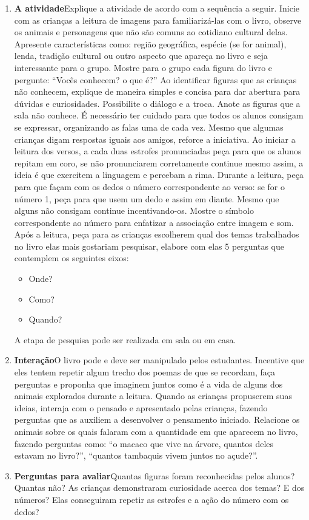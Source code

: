 \documentclass[11pt]{extarticle}
\begin{document}
\begin{enumerate}
\item \textbf{A atividade}\quad Explique a atividade de acordo com a sequência a seguir. Inicie com as crianças a leitura de imagens para familiarizá-las com o livro, observe os animais e personagens que não são comuns ao cotidiano cultural delas.  Apresente características como: região geográfica, espécie (se for animal), lenda, tradição cultural ou outro aspecto que apareça no livro e seja interessante para o grupo. 
Mostre para o grupo cada figura do livro e pergunte: ``Vocês conhecem? o que é?'' Ao identificar figuras que as crianças não conhecem, explique de maneira simples e concisa para dar abertura para dúvidas e curiosidades.  Possibilite o diálogo e a troca. Anote as figuras que a sala não conhece. É necessário ter cuidado para que todos os alunos consigam se expressar, organizando as falas uma de cada vez. Mesmo que algumas crianças digam respostas iguais aos amigos, reforce a iniciativa.
Ao iniciar a leitura dos versos, a cada duas estrofes pronunciadas peça para que os alunos repitam em coro, se não pronunciarem corretamente continue mesmo assim, a ideia é que exercitem a linguagem e percebam a rima. Durante a leitura, peça para que façam com os dedos o número correspondente ao verso: se for o número 1, peça para que usem um dedo e assim em diante. Mesmo que alguns não consigam continue incentivando-os.  Mostre o símbolo correspondente ao número para enfatizar  a associação entre imagem e som. Após a leitura, peça para as crianças escolherem qual dos temas trabalhados no livro elas mais gostariam pesquisar, elabore com elas 5 perguntas que contemplem os seguintes eixos:

\begin{itemize}
\item Onde?

\item Como?

\item Quando?
\end{itemize}

A etapa de pesquisa pode ser realizada em sala ou em casa. 

\item \textbf{Interação}\quad O livro pode e deve ser 
manipulado pelos estudantes. Incentive que eles tentem repetir algum trecho dos poemas de que se recordam,
faça perguntas e proponha que imaginem juntos como é a vida 
de alguns dos animais explorados durante a leitura. Quando as crianças propuserem suas ideias, interaja com o pensado e apresentado pelas crianças, fazendo perguntas que as auxiliem a desenvolver o pensamento iniciado.
Relacione os animais sobre os quais falaram com a quantidade em que aparecem no livro, fazendo perguntas como: ``o macaco que vive na árvore, quantos deles estavam no livro?'', ``quantos tambaquis vivem juntos no açude?''.

\item \textbf{Perguntas para avaliar}\quad Quantas figuras foram reconhecidas pelos alunos? Quantas não? As crianças demonstraram curiosidade acerca dos temas? E dos números? Elas conseguiram repetir as estrofes e a ação do número com os dedos?
\end{enumerate}
\end{document}
